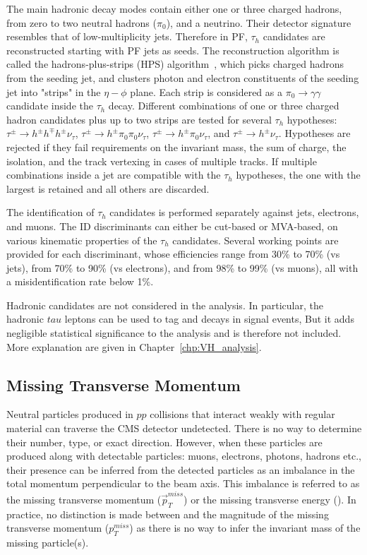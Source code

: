 The main hadronic \tau{} decay modes contain either one or three charged hadrons, from zero to two neutral hadrons ($\pi_{0}$), and a neutrino.
Their detector signature resembles that of low-multiplicity jets.
Therefore in PF, $\tau_{h}$ candidates are reconstructed starting with PF jets as seeds. 
The reconstruction algorithm is called the hadrons-plus-strips (HPS) algorithm~\cite{tau2016, tau2018},
which picks charged hadrons from the seeding jet, and clusters photon and electron constituents of the seeding jet into "strips" in the $\eta-\phi$ plane.
Each strip is considered as a $\pi_{0} \to \gamma\gamma$ candidate inside the $\tau_{h}$ decay.
Different combinations of one or three charged hadron candidates plus up to two strips are tested for several $\tau_{h}$ hypotheses:
$\tau^{\pm} \to h^{\pm}h^{\mp}h^{\pm}\nu_{\tau}$, $\tau^{\pm} \to h^{\pm}\pi_{0}\pi_{0}\nu_{\tau}$,
$\tau^{\pm} \to h^{\pm}\pi_{0}\nu_{\tau}$, and $\tau^{\pm} \to h^{\pm}\nu_{\tau}$.
Hypotheses are rejected if they fail requirements on the invariant mass, the sum of charge, the isolation, and the track vertexing in cases of multiple tracks.
If multiple combinations inside a jet are compatible with the $\tau_{h}$ hypotheses, the one with the largest \pt is retained and all others are discarded.

The identification of $\tau_{h}$ candidates is performed separately against jets, electrons, and muons.
The ID discriminants can either be cut-based or MVA-based, on various kinematic properties of the $\tau_{h}$ candidates.
Several working points are provided for each discriminant, whose efficiencies range from 30\% to 70\% (vs jets), from 70\% to 90\% (vs electrons), and from 98\% to 99\% (vs muons),
all with a misidentification rate below 1\%.

Hadronic \tau{} candidates are not considered in the \hmm analysis.
In particular, the hadronic $tau$ leptons can be used to tag \PW and \PZ decays in \VH signal events,
But it adds negligible statistical significance to the analysis and is therefore not included.
More explanation are given in Chapter~\ref{chp:VH_analysis}.

\subsection{Missing Transverse Momentum}\label{sec:reco_met}

Neutral particles produced in $pp$ collisions that interact weakly with regular material can traverse the CMS detector undetected.
There is no way to determine their number, type, or exact direction.
However, when these particles are produced along with detectable particles: muons, electrons, photons, hadrons etc.,
their presence can be inferred from the detected particles as an imbalance in the total momentum perpendicular to the beam axis.
This imbalance is referred to as the missing transverse momentum ($\vec{p}^{miss}_{T}$) or the missing transverse energy (\MET).
In practice, no distinction is made between \MET and the magnitude of the missing transverse momentum ($p^{miss}_{T}$) 
as there is no way to infer the invariant mass of the missing particle(s).

